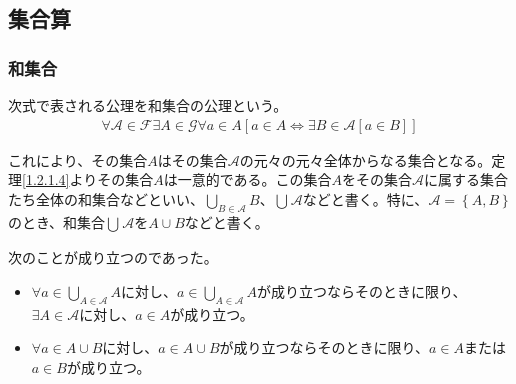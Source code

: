 \documentclass[a4paper]{jsarticle}
\begin{document}
\subsection{集合算}%
\subsubsection{和集合}%
\begin{axs*}
次式で表される公理を和集合の公理という。
\begin{align*}
\forall\mathcal{A}\in \mathcal{F\exists}A \in \mathcal{G\forall}a \in A\left[ a \in A \Leftrightarrow \exists B \in \mathcal{A}[ a \in B] \right]
\end{align*}
\end{axs*}
これにより、その集合$A$はその集合$\mathcal{A}$の元々の元々全体からなる集合となる。定理\ref{1.2.1.4}よりその集合$A$は一意的である。この集合$A$をその集合$\mathcal{A}$に属する集合たち全体の和集合などといい、$\bigcup_{B \in \mathcal{A}} B$、$\bigcup_{} \mathcal{A}$などと書く。特に、$\mathcal{A} =\left\{ A,B \right\}$のとき、和集合$\bigcup_{} \mathcal{A}$を$A \cup B$などと書く。
\begin{thm*}
次のことが成り立つのであった。
\begin{itemize}
\item
  $\forall a \in \bigcup_{A \in \mathcal{A}} A$に対し、$a \in \bigcup_{A \in \mathcal{A}} A$が成り立つならそのときに限り、$\exists A \in \mathcal{A}$に対し、$a \in A$が成り立つ。
\item
  $\forall a \in A \cup B$に対し、$a \in A \cup B$が成り立つならそのときに限り、$a \in A$または$a \in B$が成り立つ。
\end{itemize}
\end{thm*}
\end{document}
